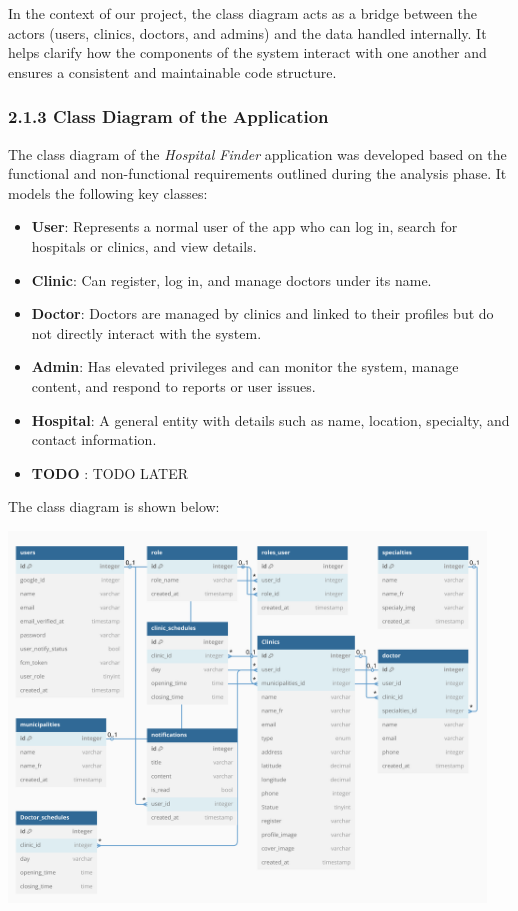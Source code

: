 \documentclass[12pt]{report}
\begin{document}
\noindent In the context of our project, the class diagram acts as a bridge between the actors (users, clinics, doctors, and admins) and the data handled internally. It helps clarify how the components of the system interact with one another and ensures a consistent and maintainable code structure.

\subsubsection*{2.1.3 Class Diagram of the Application}

The class diagram of the \textit{Hospital Finder} application was developed based on the functional and non-functional requirements outlined during the analysis phase. It models the following key classes:

\begin{itemize}

    \item \textbf{User}: Represents a normal user of the app who can log in, search for hospitals or clinics, and view details.
    \item \textbf{Clinic}: Can register, log in, and manage doctors under its name.
    \item \textbf{Doctor}: Doctors are managed by clinics and linked to their profiles but do not directly interact with the system.
    \item \textbf{Admin}: Has elevated privileges and can monitor the system, manage content, and respond to reports or user issues.
    \item \textbf{Hospital}: A general entity with details such as name, location, specialty, and contact information.
    \item \textbf{TODO }: TODO LATER 
\end{itemize}

The class diagram is shown below:

\begin{center}
    \includegraphics[width=0.95\textwidth]{images/dbclass.pdf}
\end{center}
\end{document}
